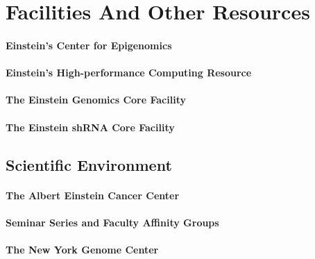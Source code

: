 
\section{Facilities And Other Resources}

\paragraph{Einstein's Center for Epigenomics} \lipsum[1-1]
\paragraph{Einstein's High-performance Computing Resource} \lipsum[2-2]
\paragraph{The Einstein Genomics Core Facility} \lipsum[3-3]
\paragraph{The Einstein shRNA Core Facility} \lipsum[4-4]

\subsection{Scientific Environment}
\paragraph{The Albert Einstein Cancer Center} \lipsum[5-6]
\paragraph{Seminar Series and Faculty Affinity Groups} \lipsum[7-7]
\paragraph{The New York Genome Center} \lipsum[7-10]